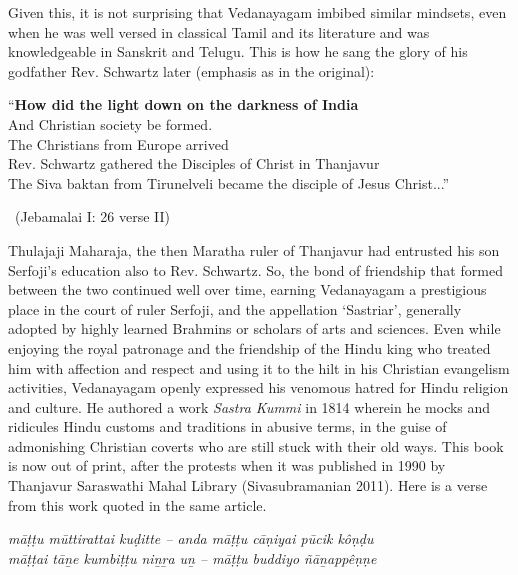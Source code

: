 Given this, it is not surprising that Vedanayagam imbibed similar mindsets, even when he was well versed in classical Tamil and its literature and was knowledgeable in Sanskrit and Telugu. This is how he sang the glory of his godfather Rev. Schwartz later (emphasis as in the original):

\begin{myquote}
“\textbf{How did the light down on the darkness of India}\\ And Christian society be formed.\\ The Christians from Europe arrived\\ Rev. Schwartz gathered the Disciples of Christ in Thanjavur\\ The Siva baktan from Tirunelveli became the disciple of Jesus Christ...” 

~\hfill (Jebamalai I: 26 verse II)
\end{myquote}

Thulajaji Maharaja, the then Maratha ruler of Thanjavur had entrusted his son Serfoji’s education also to Rev. Schwartz. So, the bond of friendship that formed between the two continued well over time, earning Vedanayagam a prestigious place in the court of ruler Serfoji, and the appellation ‘Sastriar’, generally adopted by highly learned Brahmins or scholars of arts and sciences. Even while enjoying the royal patronage and the friendship of the Hindu king who treated him with affection and respect and using it to the hilt in his Christian evangelism activities, Vedanayagam openly expressed his venomous hatred for Hindu religion and culture. He authored a work \textit{Sastra Kummi} in 1814 wherein he mocks and ridicules Hindu customs and traditions in abusive terms, in the guise of admonishing Christian coverts who are still stuck with their old ways. This book is now out of print, after the protests when it was published in 1990 by Thanjavur Saraswathi Mahal Library (Sivasubramanian 2011). Here is a verse from this work quoted in the same article.

\begin{myquote}
\textit{māṭṭu mūttirattai kuḍitte – anda māṭṭu cāṇiyai pūcik kôṇḍu\\ māṭṭai tāṉe kumbiṭṭu niṉṟa uṉ – māṭṭu buddiyo ñāṉappêṇṇe}
\end{myquote}

\begin{myquote}
\end{myquote}

